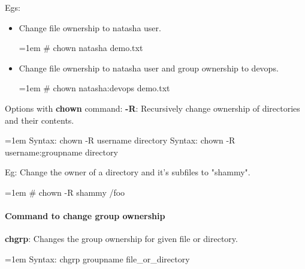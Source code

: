 \begin{flushleft}
Egs:
\begin{itemize}
	\item Change file ownership to natasha user.
	\begin{tcolorbox}[breakable,notitle,boxrule=-0pt,colback=black,colframe=black]
		\color{green}
		\font=1em
		\# chown natasha demo.txt
		\font=4pt
	\end{tcolorbox}	
	\bigskip

	\item Change file ownership to natasha user and group ownership to devops.
	\begin{tcolorbox}[breakable,notitle,boxrule=-0pt,colback=black,colframe=black]
		\color{green}
		\font=1em
		\# chown natasha:devops demo.txt
		\font=4pt
	\end{tcolorbox}
	\bigskip

\end{itemize}

Options with \textbf{chown} command:	
\newline
\textbf{-R}: Recursively change ownership of directories and their contents.
\begin{tcolorbox}[breakable,notitle,boxrule=0pt,colback=pink,colframe=pink]
	\color{black}
	\font=1em
	Syntax: chown -R username directory
	\newline
	Syntax: chown -R username:groupname directory
	\font=4pt
\end{tcolorbox}
\newline
Eg: Change the owner of a directory and it's subfiles to "shammy".
\begin{tcolorbox}[breakable,notitle,boxrule=-0pt,colback=black,colframe=black]
	\color{green}
	\font=1em
	\# chown -R shammy /foo
	\font=4pt
\end{tcolorbox}


\newpage

\paragraph{Command to change group ownership}
\bigskip
\textbf{chgrp}: Changes the group ownership for given file or directory.

\begin{tcolorbox}[breakable,notitle,boxrule=0pt,colback=pink,colframe=pink]
	\color{black}
	\font=1em
	Syntax: chgrp groupname file\_or\_directory
	\font=4pt
\end{tcolorbox}


\end{flushleft}
